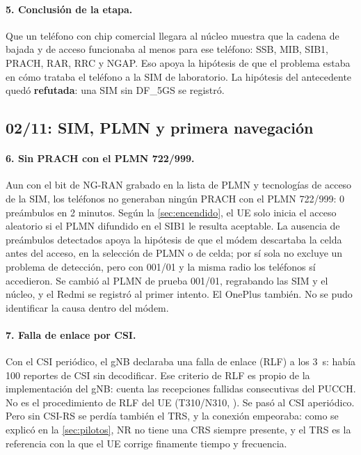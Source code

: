 \paragraph{5. Conclusión de la etapa.} Que un teléfono con chip comercial llegara al núcleo muestra que la cadena de bajada y de acceso funcionaba al menos para ese teléfono: SSB, MIB, SIB1, PRACH, RAR, RRC y NGAP. Eso apoya la hipótesis de que el problema estaba en cómo trataba el teléfono a la SIM de laboratorio. La hipótesis del antecedente quedó \textbf{refutada}: una SIM sin DF\_5GS se registró.

\subsection{02/11: SIM, PLMN y primera navegación}
\paragraph{6. Sin PRACH con el PLMN 722/999.} Aun con el bit de NG-RAN grabado en la lista de PLMN y tecnologías de acceso de la SIM, los teléfonos no generaban ningún PRACH con el PLMN 722/999: 0 preámbulos en 2 minutos. Según la \cref{sec:encendido}, el UE solo inicia el acceso aleatorio si el PLMN difundido en el SIB1 le resulta aceptable. La ausencia de preámbulos detectados apoya la hipótesis de que el módem descartaba la celda antes del acceso, en la selección de PLMN o de celda; por sí sola no excluye un problema de detección, pero con 001/01 y la misma radio los teléfonos sí accedieron. Se cambió al PLMN de prueba 001/01, regrabando las SIM y el núcleo, y el Redmi se registró al primer intento. El OnePlus también. No se pudo identificar la causa dentro del módem.

\paragraph{7. Falla de enlace por CSI.} Con el CSI periódico, el gNB declaraba una falla de enlace (RLF) a los 3~s: había 100 reportes de CSI sin decodificar. Ese criterio de RLF es propio de la implementación del gNB: cuenta las recepciones fallidas consecutivas del PUCCH. No es el procedimiento de RLF del UE (T310/N310, \cite[§5.3.10.3]{ts38331}). Se pasó al CSI aperiódico. Pero sin CSI-RS se perdía también el TRS, y la conexión empeoraba: como se explicó en la \cref{sec:pilotos}, NR no tiene una CRS siempre presente, y el TRS es la referencia con la que el UE corrige finamente tiempo y frecuencia.

